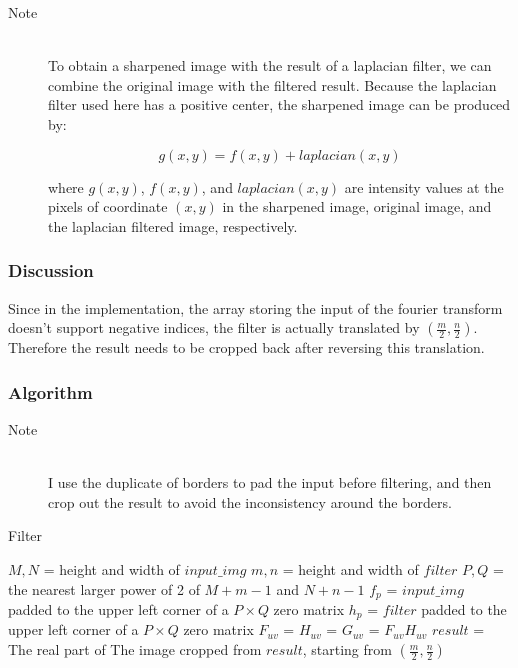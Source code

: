 \documentclass{article}
\begin{document}
\begin{description}
\item[Note] \hfill \\
To obtain a sharpened image with the result of a laplacian filter, we can combine the original image with the filtered result. Because the laplacian filter used here has a positive center, the sharpened image can be produced by:

$$g(x,y) = f(x, y) + laplacian(x, y)$$

where $g(x, y)$, $f(x, y)$, and $laplacian(x, y)$ are intensity values at the pixels of coordinate $(x, y)$ in the sharpened image, original image, and the laplacian filtered image, respectively.
\end{description}


\subsubsection{Discussion}
Since in the implementation, the array storing the input of the fourier transform doesn't support negative indices, the filter is actually translated by $(\frac{m}{2}, \frac{n}{2})$. Therefore the result needs to be cropped back after reversing this translation.

\subsubsection{Algorithm}

\begin{description}
\item[Note] \hfill \\
I use the duplicate of borders to pad the input before filtering, and then crop out the result to avoid the inconsistency around the borders.
\end{description}

\begin{algorithm}[]
\centering
\caption{Filter}
  \begin{algorithmic}[1]
     \State $M, N$ = height and width of $input\_img$
     \State $m, n$ = height and width of $filter$
     \State $P, Q$ = the nearest larger power of 2 of $M + m - 1$ and $N + n - 1$
     \State $f_p$ = $input\_img$ padded to the upper left corner of a $P \times Q$ zero matrix
     \State $h_p$ = $filter$ padded to the upper left corner of a $P \times Q$ zero matrix
	 \State $F_{uv}$ = 
	 \State $H_{uv}$ = 
	 \State $G_{uv}$ = $F_{uv} H_{uv}$
     \State $result$ = The real part of 
     \State \Return The image cropped from $result$, starting from $(\frac{m}{2}, \frac{n}{2})$
    \EndFunction
  \end{algorithmic}
\end{algorithm}


\end{document}
